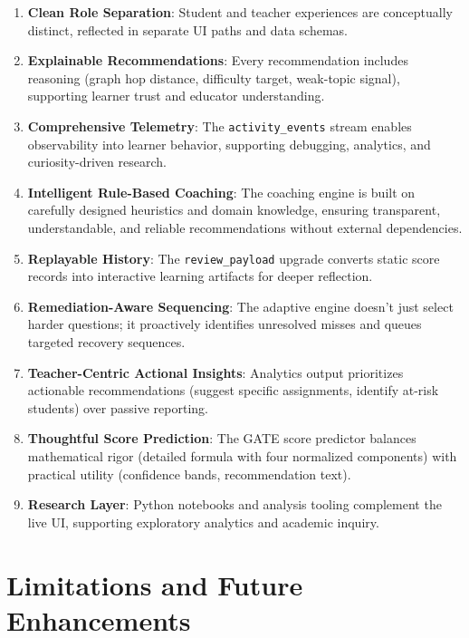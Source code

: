 \documentclass[sigconf,authordraft,twoside]{acmart}
\newcommand{\tech}[1]{\textcolor{brandblue}{\nolinkurl{#1}}}
\begin{document}
\begin{enumerate}
\item \textbf{Clean Role Separation}: Student and teacher experiences are conceptually distinct, reflected in separate UI paths and data schemas.

\item \textbf{Explainable Recommendations}: Every recommendation includes reasoning (graph hop distance, difficulty target, weak-topic signal), supporting learner trust and educator understanding.

\item \textbf{Comprehensive Telemetry}: The \tech{activity\_events} stream enables observability into learner behavior, supporting debugging, analytics, and curiosity-driven research.

\item \textbf{Intelligent Rule-Based Coaching}: The coaching engine is built on carefully designed heuristics and domain knowledge, ensuring transparent, understandable, and reliable recommendations without external dependencies.

\item \textbf{Replayable History}: The \tech{review\_payload} upgrade converts static score records into interactive learning artifacts for deeper reflection.

\item \textbf{Remediation-Aware Sequencing}: The adaptive engine doesn't just select harder questions; it proactively identifies unresolved misses and queues targeted recovery sequences.

\item \textbf{Teacher-Centric Actional Insights}: Analytics output prioritizes actionable recommendations (suggest specific assignments, identify at-risk students) over passive reporting.

\item \textbf{Thoughtful Score Prediction}: The GATE score predictor balances mathematical rigor (detailed formula with four normalized components) with practical utility (confidence bands, recommendation text).

\item \textbf{Research Layer}: Python notebooks and analysis tooling complement the live UI, supporting exploratory analytics and academic inquiry.
\end{enumerate}

\section{Limitations and Future Enhancements}
\end{document}
